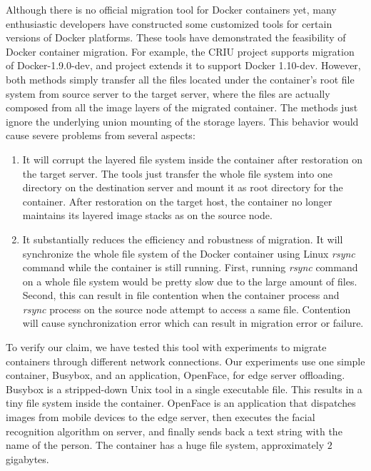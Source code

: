 Although there is no official  migration tool for Docker containers yet, many enthusiastic developers have constructed some customized tools for certain versions of Docker platforms. These tools have demonstrated the feasibility of Docker container  migration. For example, the CRIU project \cite{criu} supports migration of Docker-1.9.0-dev, and project \cite{boucherPhaul} 
 extends it to support Docker 1.10-dev. However, both methods simply transfer all the files located under the container's root file system from source server to the target server, where the files are actually composed from all the image layers of the migrated container. The methods just ignore the underlying union mounting of the storage layers.
This behavior would cause severe problems from several aspects:
\begin{enumerate}[series = tobecont]
    \item It will corrupt the layered file system inside the container after restoration  on the target server. The tools just transfer the whole file system into one directory on the destination server and mount it as root directory for the container. After restoration on the target host, the container no longer maintains its layered image stacks as on the source node. 
    \item It substantially reduces the efficiency and robustness of migration.
    It will synchronize the whole file system of the Docker container using Linux \textit{rsync} command while the container is still running. First, running \textit{rsync} command on a whole file system would be pretty slow due to the large amount of files.  Second, this can result in file contention when the container process and \textit{rsync} process on the source node attempt to access a same file. Contention will cause synchronization error which can result in migration error or failure. 
\end{enumerate}

To verify our claim, we have tested this tool with experiments to migrate containers through different network connections. Our experiments use one simple container, Busybox, and an application, OpenFace, for edge server offloading.  Busybox is a stripped-down Unix tool in a single executable file. This results in a tiny file system inside the container. OpenFace\cite{openface2016} is an application that dispatches images from mobile devices to the edge server, then executes the facial recognition algorithm on server, and finally sends back a text string with the name of the person. The container has a huge file system, approximately $2$ gigabytes.


